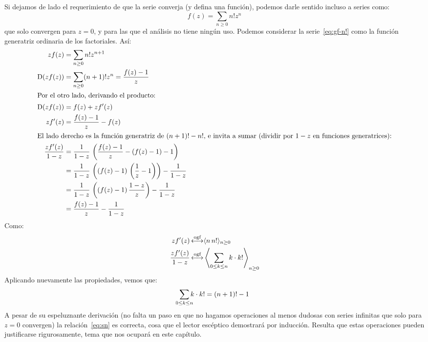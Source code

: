   Si dejamos de lado el requerimiento de que la serie converja
  (y defina una función),
  podemos darle sentido incluso a series como:
  \begin{equation}
    \label{eq:gf-n!}
    f(z)
      =\sum_{n \ge 0} n! z^n
  \end{equation}
  que solo convergen para \(z = 0\),
  y para las que el análisis no tiene ningún uso.
  Podemos considerar la serie~\eqref{eq:gf-n!}
  como la función generatriz ordinaria de los factoriales.%
  Así:
  \begin{align*}
    z f(z)
      &= \sum_{n \ge 0} n! z^{n + 1} \\
    \mathrm{D}(z f(z))
      &= \sum_{n \ge 0} (n + 1)! z^n
       = \frac{f(z) - 1}{z} \\
  \intertext{Por el otro lado, derivando el producto:}
    \mathrm{D}(z f(z))
      &= f(z) + z f'(z) \\
    z f'(z)
      &= \frac{f(z) - 1}{z} - f(z) \\
  \intertext{El lado derecho es la función generatriz de \((n + 1)! - n!\),
	     e invita a sumar
	     (dividir por \(1 - z\) en funciones generatrices):}
    \frac{z f'(z)}{1 - z}
      &= \frac{1}{1 - z} \,
	   \left(
	     \frac{f(z) - 1}{z} - (f(z) - 1) - 1
	   \right) \\
      &= \frac{1}{1 - z} \,
	   \left(
	     (f(z) - 1) \, \left( \frac{1}{z} - 1 \right)
	   \right)
	   - \frac{1}{1 - z} \\
      &= \frac{1}{1 - z} \,
	   \left(
	     (f(z) - 1) \, \frac{1 - z}{z}
	   \right)
	   - \frac{1}{1 - z} \\
      &= \frac{f(z) - 1}{z} - \frac{1}{1 - z}
  \end{align*}
  Como:
  \begin{align*}
    z f'(z)
      &\operatorname{\stackrel{\text{ogf}}{\longleftrightarrow}} \langle n \, n! \rangle_{n \ge 0} \\
    \frac{z f'(z)}{1 - z}
      &\operatorname{\stackrel{\text{ogf}}{\longleftrightarrow}} \left\langle
	      \sum_{0 \le k \le n} k \cdot k!
	    \right\rangle_{n \ge 0}
  \end{align*}
  Aplicando nuevamente las propiedades,
  vemos que:
  \begin{equation}
    \label{eq:sn}
    \sum_{\mathclap{0 \le k \le n}} k \cdot k!
      = (n + 1)! - 1
  \end{equation}
  A pesar de su espeluznante derivación
  (no falta un paso en que no hagamos operaciones al menos dudosas
   con series infinitas que solo para \(z = 0\) convergen)
  la relación~\eqref{eq:sn} es correcta,
  cosa que el lector escéptico demostrará por inducción.%
  Resulta que estas operaciones pueden justificarse rigurosamente,
  tema que nos ocupará en este capítulo.

